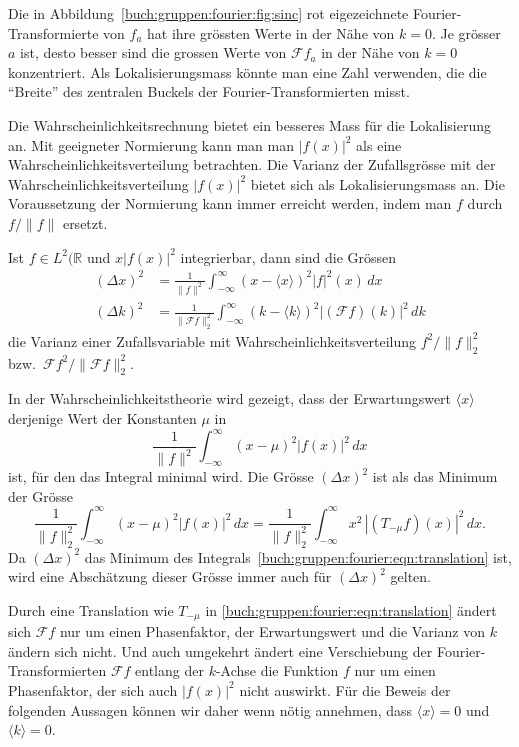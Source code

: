 Die in Abbildung~\ref{buch:gruppen:fourier:fig:sinc}
rot eigezeichnete Fourier-Transformierte von $f_a$ hat ihre grössten 
Werte in der Nähe von $k=0$.
Je grösser $a$ ist, desto besser sind die grossen Werte von $\mathscr{F}f_a$
in der Nähe von $k=0$ konzentriert.
Als Lokalisierungsmass könnte man eine Zahl verwenden, die die ``Breite''
des zentralen Buckels der Fourier-Transformierten misst.

Die Wahrscheinlichkeitsrechnung bietet ein besseres Mass für die
Lokalisierung an.
Mit geeigneter Normierung kann man man $|f(x)|^2$ als eine
Wahrscheinlichkeitsverteilung betrachten.
Die Varianz der Zufallsgrösse mit der Wahrscheinlichkeitsverteilung
$|f(x)|^2$ bietet sich als Lokalisierungsmass an.
Die Voraussetzung der Normierung kann immer erreicht werden, indem man
$f$ durch $f/\|f\|$ ersetzt.


\begin{definition}
Ist $f\in L^2(\mathbb{R}$ und $x|f(x)|^2$ integrierbar, dann sind
die Grössen
\begin{align*}
(\Delta x)^2
&=
\frac{1}{\|f\|^2}
\int_{-\infty}^\infty
(x-\langle x\rangle)^2
|f|^2(x)
\,dx
\\
(\Delta k)^2
&=
\frac{1}{\|\mathscr{F}f\|_2^2}
\int_{-\infty}^\infty
(k-\langle k\rangle)^2
|(\mathscr{F}f)(k)|^2
\,dk
\end{align*}
die Varianz einer Zufallsvariable mit Wahrscheinlichkeitsverteilung
$f^2/\|f\|_2^2$ bzw.~$\mathscr{F}f^2/\|\mathscr{F}f\|_2^2$.
\end{definition}

In der Wahrscheinlichkeitstheorie wird gezeigt, dass der Erwartungswert
$\langle x\rangle$ derjenige Wert der Konstanten $\mu$ in
\begin{equation*}
\frac{1}{\|f\|^2}
\int_{-\infty}^\infty
(x-\mu)^2 
|f(x)|^2
\,dx
\end{equation*}
ist, für den das Integral minimal wird.
Die Grösse $(\Delta x)^2$ ist als das Minimum der Grösse
\begin{equation}
\frac{1}{\|f\|_2^2}
\int_{-\infty}^\infty
(x-\mu)^2 
|f(x)|^2
\,dx
=
\frac{1}{\|f\|_2^2}
\int_{-\infty}^\infty
x^2\, |(T_{-\mu}f)(x)|^2
\,dx.
\label{buch:gruppen:fourier:eqn:translation}
\end{equation}
Da $(\Delta x)^2$ das Minimum des
Integrals~\eqref{buch:gruppen:fourier:eqn:translation} ist, wird
eine Abschätzung dieser Grösse immer auch für $(\Delta x)^2$ gelten.

Durch eine Translation wie $T_{-\mu}$ in
\eqref{buch:gruppen:fourier:eqn:translation}
ändert sich $\mathscr{F}f$ nur um einen Phasenfaktor,
der Erwartungswert und die Varianz von $k$ ändern sich nicht.
Und auch umgekehrt ändert eine Verschiebung der Fourier-Transformierten
$\mathscr{F}f$ entlang der $k$-Achse die Funktion $f$ nur um einen
Phasenfaktor, der sich auch $|f(x)|^2$ nicht auswirkt. 
Für die Beweis der folgenden Aussagen können wir daher wenn nötig annehmen,
dass $\langle x\rangle=0$ und $\langle k\rangle = 0$.

